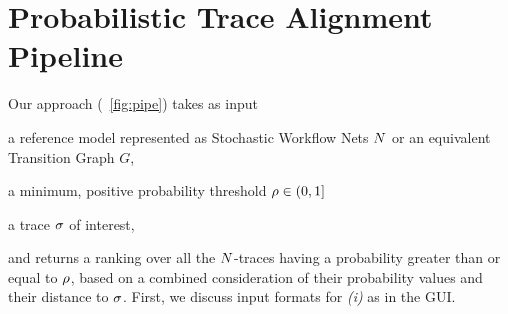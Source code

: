 \section{Probabilistic Trace Alignment Pipeline}
Our approach (\figurename~\ref{fig:pipe}) takes as input
\begin{inparaenum}[\it (i)]
	\item a reference model represented as Stochastic Workflow Nets $N$ or an equivalent Transition Graph $G$,
	\item a minimum, positive probability threshold $\rho \in (0,1]$
	\item a trace $\sigma$ of interest,
\end{inparaenum}
and returns a ranking over all the $N$-traces having a probability greater than or equal to $\rho$, based on a combined consideration of their probability values and their distance to $\sigma$. First, we discuss input formats for \textit{(i)} as in the GUI.





